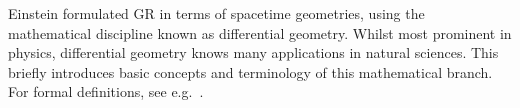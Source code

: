 





\newcommand\Chr{\ChristophelSym}
\newcommand*\Kd{\Krondelta}
\newcommand*\Ric{\RicciScalar}
\newcommand\cfac{\Upsilon}
\newcommand\wt{\widetilde}
\newcommand\hypacc{\ALIAShypacc}













Einstein formulated GR in terms of spacetime geometries, using the mathematical discipline known as differential geometry. 
Whilst most prominent in physics, differential geometry knows many applications in natural sciences. This~ briefly introduces basic concepts and terminology of this mathematical branch. For formal definitions, see e.g.~\citet{carrollSpacetimeGeometryIntroduction2019}.


